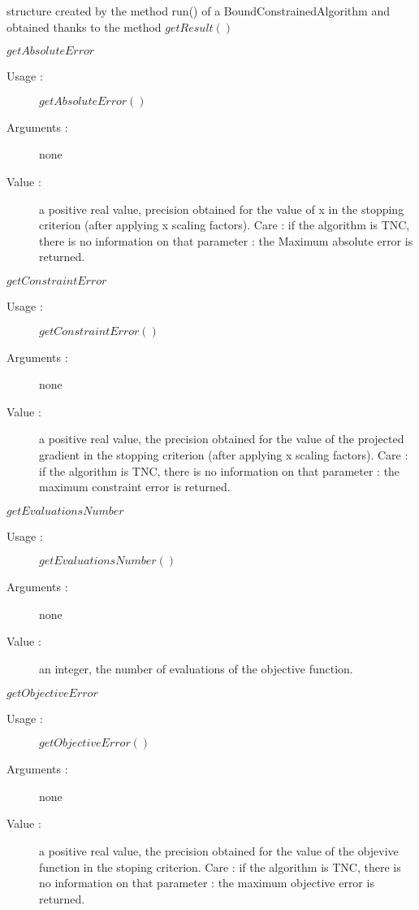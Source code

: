 \begin{description}
\item[Usage :] structure created by the method run() of a BoundConstrainedAlgorithm and obtained thanks to the method $getResult()$

\item[Some methods :]  \rule{0pt}{1em}

  \begin{description}

  \item $getAbsoluteError$
    \begin{description}
    \item[Usage :] $getAbsoluteError()$
    \item[Arguments :] none
    \item[Value :] a positive real value, precision obtained for the value of x in the stopping criterion (after applying x scaling factors). Care : if the algorithm is TNC, there is no information on that parameter : the Maximum absolute error is returned.
    \end{description}
    \bigskip

  \item $getConstraintError$
    \begin{description}
    \item[Usage :] $getConstraintError()$
    \item[Arguments :] none
    \item[Value :] a positive real value, the precision obtained for the value of the projected gradient in the stopping criterion (after applying x scaling factors).  Care : if the algorithm is TNC, there is no information on that parameter : the maximum constraint error is returned.
    \end{description}
    \bigskip

  \item $getEvaluationsNumber$
    \begin{description}
    \item[Usage :] $getEvaluationsNumber()$
    \item[Arguments :] none
    \item[Value :] an integer, the  number of evaluations of the objective function.
    \end{description}
    \bigskip

  \item $getObjectiveError$
    \begin{description}
    \item[Usage :] $getObjectiveError()$
    \item[Arguments :] none
    \item[Value :] a positive real value, the precision obtained for the value of the objevive function in the stoping criterion. Care : if the algorithm is TNC, there is no information on that parameter : the maximum objective error is returned.
    \end{description}
    \bigskip


\end{description}
\end{description}
